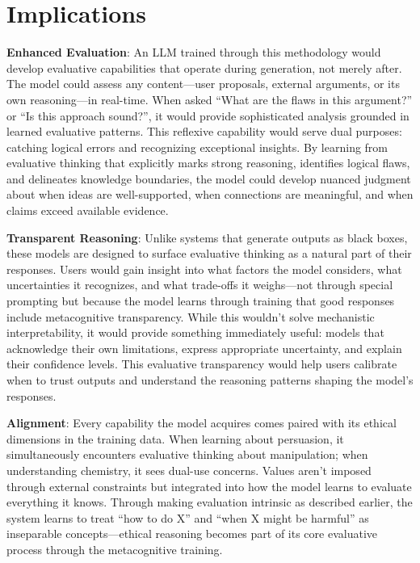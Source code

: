 \documentclass[11pt]{article}
\begin{document}
	\section{Implications}
	
	\textbf{Enhanced Evaluation}: An LLM trained through this methodology would develop evaluative capabilities that operate during generation, not merely after. The model could assess any content---user proposals, external arguments, or its own reasoning---in real-time. When asked ``What are the flaws in this argument?'' or ``Is this approach sound?'', it would provide sophisticated analysis grounded in learned evaluative patterns. This reflexive capability would serve dual purposes: catching logical errors and recognizing exceptional insights. By learning from evaluative thinking that explicitly marks strong reasoning, identifies logical flaws, and delineates knowledge boundaries, the model could develop nuanced judgment about when ideas are well-supported, when connections are meaningful, and when claims exceed available evidence.
	
	\textbf{Transparent Reasoning}: Unlike systems that generate outputs as black boxes, these models are designed to surface evaluative thinking as a natural part of their responses. Users would gain insight into what factors the model considers, what uncertainties it recognizes, and what trade-offs it weighs---not through special prompting but because the model learns through training that good responses include metacognitive transparency. While this wouldn't solve mechanistic interpretability, it would provide something immediately useful: models that acknowledge their own limitations, express appropriate uncertainty, and explain their confidence levels. This evaluative transparency would help users calibrate when to trust outputs and understand the reasoning patterns shaping the model's responses.
	
	\textbf{Alignment}: Every capability the model acquires comes paired with its ethical dimensions in the training data. When learning about persuasion, it simultaneously encounters evaluative thinking about manipulation; when understanding chemistry, it sees dual-use concerns. Values aren't imposed through external constraints but integrated into how the model learns to evaluate everything it knows. Through making evaluation intrinsic as described earlier, the system learns to treat ``how to do X'' and ``when X might be harmful'' as inseparable concepts---ethical reasoning becomes part of its core evaluative process through the metacognitive training.
	
\end{document}
